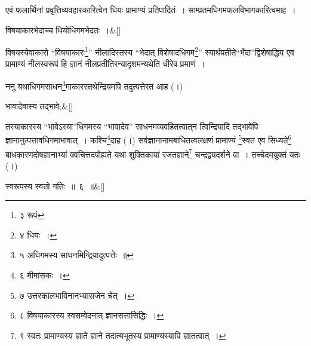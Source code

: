 \documentclass[article,12pt,a4paper]{memoir}
\begin{document}
	

	  \pstart एवं फलार्थिनां प्रवृत्तिव्यवहारकारित्वेन धियः प्रामाण्यं प्रतिपादितं । साम्प्रतमधिगमफलविभागकारित्वमाह ।
	\pend
      
	  \bigskip
	  \begingroup
	
	    \large
	  
	    
	    \stanza[\smallbreak]
	\label{pv.1.6a}विषयाकारभेदाच्च धियोधिगमभेदतः ।\&[\smallbreak]


	
	  \endgroup
	

	   विषयस्येवाकारो {\color{DodgerBlue3}“विषयाकारः\footnote{\label{pvv.5-3}  ३ रूपं}”} नीलादिस्तस्य {\color{DodgerBlue3}“भेदात् विशेषादधिगम\footnote{\label{pvv.5-4}  ४ धियः ।}”} स्यार्थप्रतीते{\color{DodgerBlue3}“र्भेदा”}द्विशेषाद्धिय एव प्रामाण्यं नीलस्वरूपं हि ज्ञानं नीलप्रतीतिरन्यादृशमन्यथेति धीरेव प्रमाणं ।
	\pend
      

	  \pstart ननु यथाधिगमसाधन\footnote{\label{pvv.5-5}  ५ अधिगमस्य साधनमिन्द्रियादुत्पत्तेः ॥}माकारस्तथेन्द्रियमपि तदुत्पत्तेरत आह (।)
	\pend
      
	  \bigskip
	  \begingroup
	
	    \large
	  
	    
	    \stanza[\smallbreak]
	\label{pv.1.6b}भावादेवास्य तद्भावे;\&[\smallbreak]


	
	  \endgroup
	

	  \pstart तस्याकारस्य {\color{DodgerBlue3}“भावेऽस्या”}धिगमस्य {\color{DodgerBlue3}“भावादेव”} साधनमव्यवहितत्वात्‌न त्विन्द्रियादि तद्भावेपि ज्ञानानुत्पत्तावधिगमाभावात् । कश्चि\footnote{\label{pvv.5-6}  ६ मीमांसकः ।}दाह (।) सर्वज्ञानानामबाधितत्वलक्षणं प्रामाण्यं \footnote{\label{pvv.5-7}  ७ उत्तरकालभाविनानभ्यासजेन चेत् ।}स्वत एव सिध्यते\footnote{\label{pvv.5-8}  ८ विषयाकारस्य स्वसम्वेदनात् ज्ञानसत्तासिद्धिः ।} बाधकारणदोषज्ञानाभ्यां क्वचित्तदपोह्यते यथा शुक्तिकायां रजतज्ञाने\footnote{\label{pvv.5-9}  ९ स्वतः प्रामाण्यस्य ज्ञाते ज्ञाने तदात्मभूतस्य प्रामाण्यस्यापि ज्ञातत्वात् ।} चन्द्रद्वयदर्शने वा । तच्चेदमयुक्तं यतः (।)
	\pend
      
	  \bigskip
	  \begingroup
	
	    \large
	  
	    
	    \stanza[\smallbreak]
	\label{pv.1.6c}स्वरूपस्य स्वतो गतिः ॥ ६ ॥\&[\smallbreak]
\end{document}
